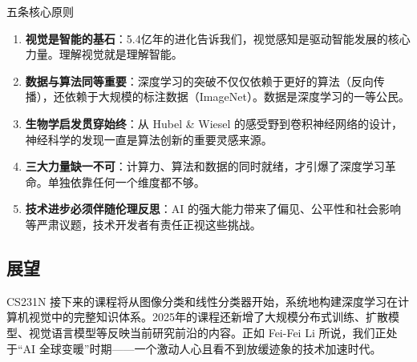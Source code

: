 \begin{importantbox}{五条核心原则}
\begin{enumerate}
    \item \textbf{视觉是智能的基石}：5.4亿年的进化告诉我们，视觉感知是驱动智能发展的核心力量。理解视觉就是理解智能。
    \item \textbf{数据与算法同等重要}：深度学习的突破不仅仅依赖于更好的算法（反向传播），还依赖于大规模的标注数据（ImageNet）。数据是深度学习的一等公民。
    \item \textbf{生物学启发贯穿始终}：从 Hubel \& Wiesel 的感受野到卷积神经网络的设计，神经科学的发现一直是算法创新的重要灵感来源。
    \item \textbf{三大力量缺一不可}：计算力、算法和数据的同时就绪，才引爆了深度学习革命。单独依靠任何一个维度都不够。
    \item \textbf{技术进步必须伴随伦理反思}：AI 的强大能力带来了偏见、公平性和社会影响等严肃议题，技术开发者有责任正视这些挑战。
\end{enumerate}
\end{importantbox}

\subsection{展望}

CS231N 接下来的课程将从图像分类和线性分类器开始，系统地构建深度学习在计算机视觉中的完整知识体系。2025年的课程还新增了大规模分布式训练、扩散模型、视觉语言模型等反映当前研究前沿的内容。正如 Fei-Fei Li 所说，我们正处于``AI 全球变暖''时期——一个激动人心且看不到放缓迹象的技术加速时代。



